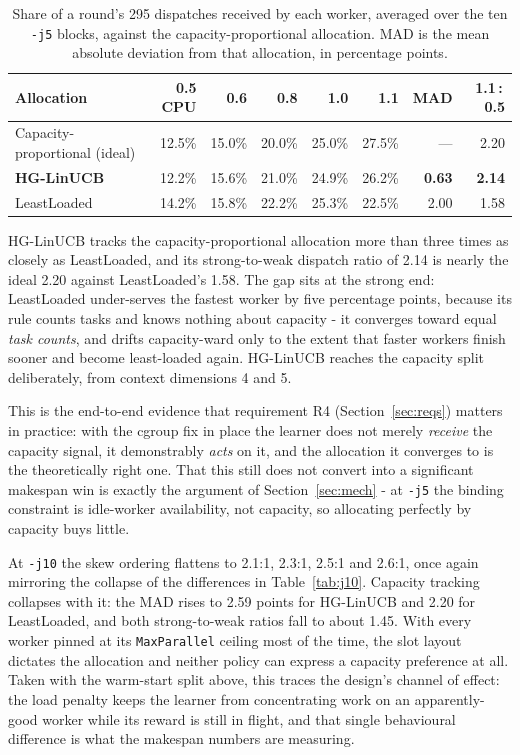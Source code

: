 \documentclass[final,5p,times,twocolumn]{elsarticle}
\begin{document}
\begin{table}[t]
\centering
\caption{Share of a round's 295 dispatches received by each worker, averaged over the ten \texttt{-j5} blocks, against the capacity-proportional allocation. MAD is the mean absolute deviation from that allocation, in percentage points.}
\label{tab:capshare}
\small
\begin{tabular}{lrrrrrrr}
\toprule
Allocation & 0.5 CPU & 0.6 & 0.8 & 1.0 & 1.1 & MAD & 1.1\,:\,0.5 \\
\midrule
Capacity-proportional (ideal) & 12.5\% & 15.0\% & 20.0\% & 25.0\% & 27.5\% & --- & 2.20 \\
\textbf{HG-LinUCB} & 12.2\% & 15.6\% & 21.0\% & 24.9\% & 26.2\% & \textbf{0.63} & \textbf{2.14} \\
LeastLoaded & 14.2\% & 15.8\% & 22.2\% & 25.3\% & 22.5\% & 2.00 & 1.58 \\
\bottomrule
\end{tabular}
\end{table}

HG-LinUCB tracks the capacity-proportional allocation more than three times as closely as LeastLoaded, and its strong-to-weak dispatch ratio of 2.14 is nearly the ideal 2.20 against LeastLoaded's 1.58. The gap sits at the strong end: LeastLoaded under-serves the fastest worker by five percentage points, because its rule counts tasks and knows nothing about capacity - it converges toward equal \emph{task counts}, and drifts capacity-ward only to the extent that faster workers finish sooner and become least-loaded again. HG-LinUCB reaches the capacity split deliberately, from context dimensions 4 and 5.

This is the end-to-end evidence that requirement R4 (Section~\ref{sec:reqs}) matters in practice: with the cgroup fix in place the learner does not merely \emph{receive} the capacity signal, it demonstrably \emph{acts} on it, and the allocation it converges to is the theoretically right one. That this still does not convert into a significant makespan win is exactly the argument of Section~\ref{sec:mech} - at \texttt{-j5} the binding constraint is idle-worker availability, not capacity, so allocating perfectly by capacity buys little.

At \texttt{-j10} the skew ordering flattens to 2.1:1, 2.3:1, 2.5:1 and 2.6:1, once again mirroring the collapse of the differences in Table~\ref{tab:j10}. Capacity tracking collapses with it: the MAD rises to 2.59 points for HG-LinUCB and 2.20 for LeastLoaded, and both strong-to-weak ratios fall to about 1.45. With every worker pinned at its \texttt{MaxParallel} ceiling most of the time, the slot layout dictates the allocation and neither policy can express a capacity preference at all. Taken with the warm-start split above, this traces the design's channel of effect: the load penalty keeps the learner from concentrating work on an apparently-good worker while its reward is still in flight, and that single behavioural difference is what the makespan numbers are measuring.
\end{document}
